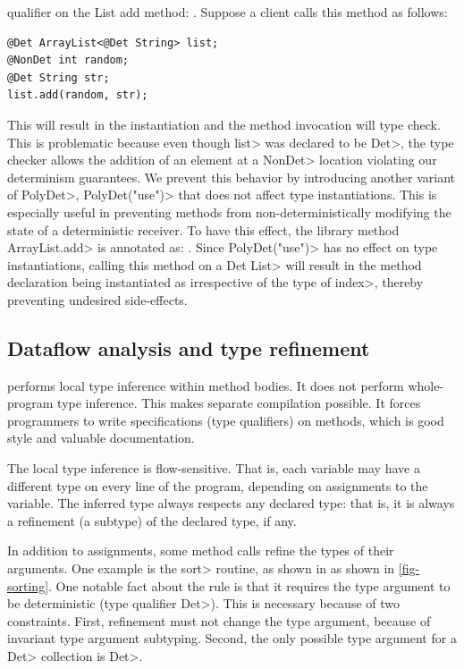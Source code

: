 qualifier 
on the List add method: .
Suppose a client calls this method as follows:
\begin{verbatim}
@Det ArrayList<@Det String> list;
@NonDet int random;
@Det String str;
list.add(random, str);
\end{verbatim}
This will result in the instantiation  and
the method invocation will type check. This is problematic because even though \<list> was declared to be \<Det>,
the type checker allows the addition of an element at a \<NonDet> location violating our determinism guarantees.
We prevent this behavior by introducing another variant of \<PolyDet>, \<PolyDet("use")> that does not affect
type instantiations. This is especially useful in preventing methods from non-deterministically modifying the state
of a deterministic receiver. To have this effect, the library method \<ArrayList.add> is annotated as:
.
Since \<PolyDet("use")> has no effect on type instantiations, calling this method on a \<Det List>
will result in the method declaration being instantiated as 
irrespective of the type of \<index>, thereby preventing undesired side-effects.


\subsection{Dataflow analysis and type refinement}\label{dataflow}
\TheDeterminismChecker performs local type inference within method bodies.
It does not perform whole-program type inference.
This makes separate compilation possible.
It forces programmers to write specifications (type qualifiers) on methods,
which is good style and valuable documentation.

The local type inference is flow-sensitive.  That is, each variable may
have a different type on every line of the program, depending on
assignments to the variable.  The inferred type always respects any
declared type:  that is, it is always a refinement (a subtype) of the
declared type, if any.

In addition to assignments, some method calls refine the types of their
arguments.  One example is the \<sort> routine, as shown in 
as shown in \cref{fig-sorting}.  One notable fact about the 
rule is that it requires the type argument to be deterministic (type
qualifier \<Det>).  This is necessary because of two constraints.
First, refinement must not change the type argument, because of invariant
type argument subtyping.
Second, the only possible type argument for a \<Det> collection is \<Det>.


